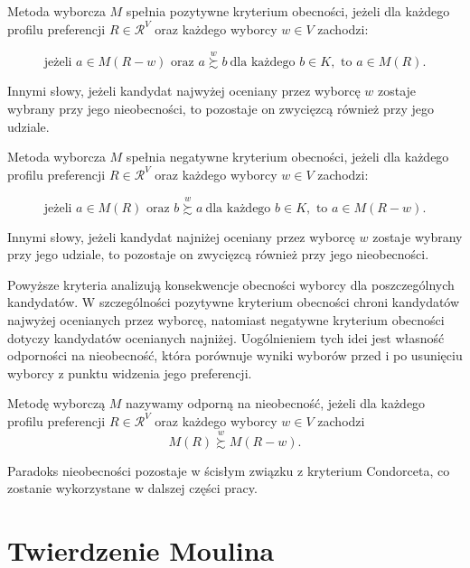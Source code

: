 \documentclass[12pt,a4paper]{mwrep}
\begin{document}
	\medskip
	
	\begin{definition}
		Metoda wyborcza \(M\) spełnia pozytywne kryterium obecności, jeżeli dla każdego profilu preferencji \(R \in \mathcal{R}^{V}\) oraz każdego wyborcy \(w \in V\) zachodzi:
		
		\[
		\text{jeżeli } a \in M(R - w) \text{ oraz } a \overset{w}{\succsim} b \ \text{dla każdego } b \in K,
		\text{ to } a \in M(R).
		\]
		
		Innymi słowy, jeżeli kandydat najwyżej oceniany przez wyborcę \(w\) zostaje wybrany przy jego nieobecności, to pozostaje on zwycięzcą również przy jego udziale.
	\end{definition}

	\begin{definition}
		Metoda wyborcza \(M\) spełnia negatywne kryterium obecności, jeżeli dla każdego profilu preferencji \(R \in \mathcal{R}^{V}\) oraz każdego wyborcy \(w \in V\) zachodzi:
		
		\[
		\text{jeżeli } a \in M(R) \text{ oraz } b \overset{w}{\succsim} a \ \text{dla każdego } b \in K,
		\text{ to } a \in M(R - w).
		\]
		
		Innymi słowy, jeżeli kandydat najniżej oceniany przez wyborcę \(w\) zostaje wybrany przy jego udziale, to pozostaje on zwycięzcą również przy jego nieobecności.
	\end{definition}
	
	Powyższe kryteria analizują konsekwencje obecności wyborcy dla poszczególnych kandydatów. W szczególności pozytywne kryterium obecności chroni kandydatów najwyżej ocenianych przez wyborcę, natomiast negatywne kryterium obecności dotyczy kandydatów ocenianych najniżej. Uogólnieniem tych idei jest własność odporności na nieobecność, która porównuje wyniki wyborów przed i po usunięciu wyborcy z punktu widzenia jego preferencji.
	
	\begin{definition}
		Metodę wyborczą \(M\) nazywamy odporną na nieobecność, jeżeli dla każdego profilu preferencji \(R \in \mathcal{R}^{V}\) oraz każdego wyborcy \(w \in V\) zachodzi
		\[
		M(R) \overset{w}{\succsim} M(R - w).
		\]
	\end{definition}
	
	Paradoks nieobecności pozostaje w ścisłym związku z kryterium Condorceta, co zostanie wykorzystane w dalszej części pracy.
	
	\section{Twierdzenie Moulina}
\end{document}
